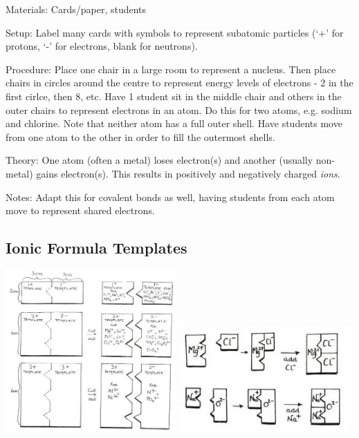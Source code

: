 \begin{multicols}{2}
\begin{description*}
\item[Materials:]{Cards/paper, students}
\item[Setup:]{Label many cards with symbols to represent subatomic particles (`+' for protons, `-' for electrons, blank for neutrons).}
\item[Procedure:]{Place one chair in a large room to represent a nucleus. Then place chairs in circles around the centre to represent energy levels of electrons - 2 in the first cirlce, then 8, etc. Have 1 student sit in the middle chair and others in the outer chairs to represent electrons in an atom. Do this for two atoms, e.g. sodium and chlorine. Note that neither atom has a full outer shell. Have students move from one atom to the other in order to fill the outermost shells. }
\item[Theory:]{One atom (often a metal) loses electron(s) and another (usually non-metal) gains electron(s). This results in positively and negatively charged \emph{ions}.}
\item[Notes:]{Adapt this for covalent bonds as well, having students from each atom move to represent shared electrons.}
\end{description*}

\columnbreak

\subsection{Ionic Formula Templates}

\begin{center}
\includegraphics[width=0.49\textwidth]{./img/source/ion-template.jpg}
\includegraphics[width=0.49\textwidth]{./img/source/ion-template-2.jpg}
\end{center}


\end{multicols}
